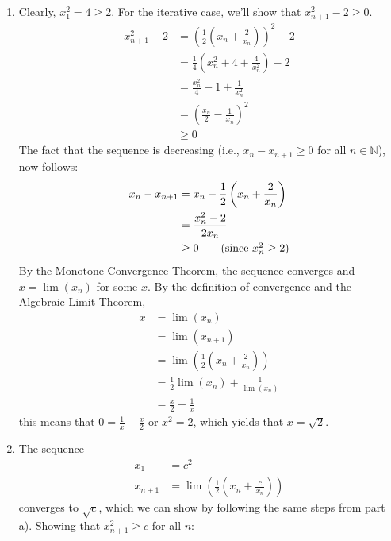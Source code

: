 \documentclass[a4paper]{report}
\newenvironment{ex}[1]
    {\noindent{\large \bf Exercise #1.}}{\vspace{0.5cm}}
\begin{document}
\begin{ex}{2.4.5}
  \begin{enumerate}[label=\alph*)]
  \item Clearly, $x_1^2 = 4 \geq 2$. For the iterative case, we'll show that $x_{n+1}^2 -2 \geq 0$.
    \begin{align*}
      x_{n+1}^2 - 2 &= \left(\frac{1}{2}\left(x_n + \frac{2}{x_n}\right)\right)^2 - 2\\
                   &= \frac{1}{4}\left(x_n^2 + 4 + \frac{4}{x_n^2}\right) - 2\\
                   &= \frac{x_n^2}{4} - 1 + \frac{1}{x_n^2} \\
                   &= \left(\frac{x_n}{2} - \frac{1}{x_n} \right)^2 \\
                   &\geq 0
    \end{align*}
The fact that the sequence is decreasing (i.e., $x_n - x_{n+1} \geq 0$ for all $n \in \mathbb{N}$), now follows:
    \begin{align*}
      x_n - x_{n+1} &= x_n - \frac{1}{2}\left(x_n + \frac{2}{x_n}\right) \\
                   &= \frac{x_n^2 - 2}{2 x_{n}} \\
                   &\geq 0 \tag{since $x_{n}^2 \geq 2$}
    \end{align*}
  By the Monotone Convergence Theorem, the sequence converges and $x = \lim(x_n)$ for some $x$. By the definition of convergence
  and the Algebraic Limit Theorem,
\begin{align*}
 x &= \lim (x_n) \\
   &= \lim (x_{n+1}) \\
   &= \lim \left(\frac{1}{2} \left(x_n + \frac{2}{x_n} \right) \right) \\ 
   &= \frac{1}{2} \lim(x_n) + \frac{1}{\lim(x_n)} \\
   &= \frac{x}{2} + \frac{1}{x}
\end{align*}
this means that $0 = \frac{1}{x} - \frac{x}{2}$ or $x^2 = 2$, which yields that $x = \sqrt{2}$.
 \item The sequence
   \begin{align*}
   x_1 &= c^2  \\
   x_{n+1} &= \lim \left(\frac{1}{2} \left(x_n + \frac{c}{x_n} \right) \right)
   \end{align*}
converges to $\sqrt{c}$, which we can show by following the same steps from part a). Showing that $x_{n+1}^2 \geq c$ for all $n$:
    \begin{align*}

\end{align*}
\end{enumerate}
\end{ex}
\end{document}
